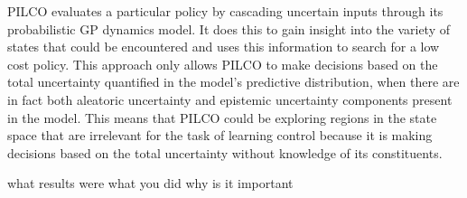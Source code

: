 PILCO evaluates a particular policy by cascading uncertain inputs through its probabilistic GP dynamics model. It does this to gain insight into the variety of states that could be encountered and uses this information to search for a low cost policy. This approach only allows PILCO to make decisions based on the total uncertainty quantified in the model's predictive distribution, when there are in fact both aleatoric uncertainty and epistemic uncertainty components present in the model. This means that PILCO could be exploring regions in the state space that are irrelevant for the task of learning control because it is making decisions based on the total uncertainty without knowledge of its constituents. 

what results were
what you did
why is it important



